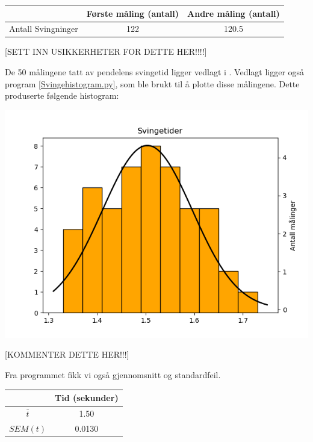 \begin{center}
\begin{tabular}{ | c | c | c | }
    \hline
    & Første måling (antall) & Andre måling (antall)\\ 
    \hline
    Antall Svingninger & 122 & 120.5\\ 
    \hline
\end{tabular}
\end{center}

[SETT INN USIKKERHETER FOR DETTE HER!!!!] \bigskip

De 50 målingene tatt av pendelens svingetid ligger vedlagt i . Vedlagt ligger også program \ref{Svingehistogram.py}, som ble brukt til å plotte disse målingene. Dette produserte følgende histogram:

\begin{center}
    \includegraphics[scale = 0.6]{Figurer/Lab_1_Hist_1.png} \label{Hist_1}
\end{center}

[KOMMENTER DETTE HER!!!]\bigskip

Fra programmet fikk vi også gjennomsnitt og standardfeil.

\begin{center}
\begin{tabular}{ | c | c | }
    \hline
    & Tid (sekunder)\\
    \hline
     $\bar{t}$ & 1.50\\
    \hline
     $SEM(t)$ & 0.0130\\
    \hline
\end{tabular}
\end{center}

